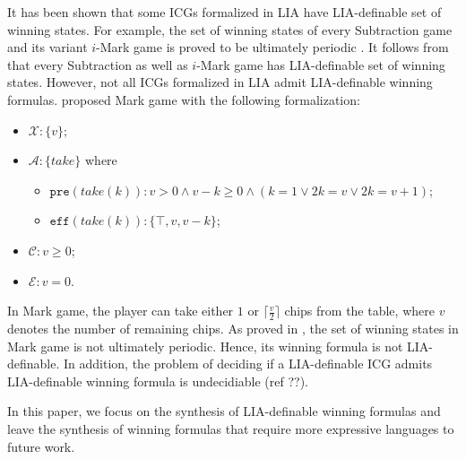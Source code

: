\documentclass[review]{elsarticle}
\newcommand{\set}[1]{\{ #1 \}}
\newcommand{\true}{\top}
\newcommand{\statevar}{\mathcal{X}}
\newcommand{\act}{\mathcal{A}}
\newcommand{\constraint}{\mathcal{C}}
\newcommand{\estate}{\mathcal{E}}
\newcommand{\pre}{\mathtt{pre}}
\newcommand{\eff}{\mathtt{eff}}
\newcommand{\largestInt}[1][]{\lfloor#1\rfloor}
\begin{document}
	It has been shown that some ICGs formalized in LIA have LIA-definable set of winning states.
	For example, the set of winning states of every Subtraction game and its variant $i$-Mark game is proved to be ultimately periodic \cite{BerCG2001,Sop2016}.
	It follows from \cite{Pre1929} that every Subtraction as well as $i$-Mark game has LIA-definable set of winning states.
	However, not all ICGs formalized in LIA admit LIA-definable winning formulas.
	\citet{Kru2009} proposed Mark game with the following formalization:
	\begin{itemize}
		\item $\statevar: \set{v}$;
		
		\item $\act: \set{take}$ where 
		\begin{itemize}
			\item $\pre(take(k)) : v > 0 \land v - k \geq 0 \land (k = 1 \lor 2k = v \lor 2k = v + 1)$;
			\item $\eff(take(k)): \set{\true, v, v - k}$;
		\end{itemize}
		
		\item $\constraint: v \geq 0$;
		
		\item $\estate: v = 0$.
	\end{itemize}
	In Mark game, the player can take either $1$ or $\lceil \frac{v}{2} \rceil$ chips from the table, where $v$ denotes the number of remaining chips.
	As proved in \cite{Fra2011}, the set of winning states in Mark game is not ultimately periodic. Hence, its winning formula is not LIA-definable.
	In addition, the problem of deciding if a LIA-definable ICG admits LIA-definable winning formula is undecidiable (ref ??).
	
	In this paper, we focus on the synthesis of LIA-definable winning formulas and leave the synthesis of winning formulas that require more expressive languages to future work.
	    
\end{document}
